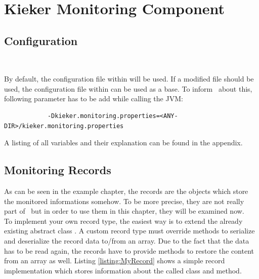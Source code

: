 % 


\chapter{Kieker Monitoring Component}\label{chap:componentsMonitoring}


	\section{Configuration}


\

\noindent By default, the configuration file within \dir{\mainJar} will be used. If a modified file should be used, the configuration file within  can be used as a base. To inform \Kieker\  about this, following parameter has to be add while calling the JVM:

		\setBashListing
		\begin{lstlisting} 
			-Dkieker.monitoring.properties=<ANY-DIR>/kieker.monitoring.properties      
		\end{lstlisting}

		\noindent A listing of all variables and their explanation can be found in the
		appendix.


	\section{Monitoring Records}\label{sec:componentsMonitoring:monitoringRecords}

		As can be seen in the example chapter, the records are the objects which store the monitored informations somehow. To be more precise, they are not really part of \KiekerMonitoringPart\, but in order to use them in this chapter, they will be examined now.\\ To implement your own record type, the easiest way is to extend the already existing abstract class . A custom record type must override methods to serialize and deserialize the record data to/from an array. Due to the fact that the data has to be read again, the records have to provide methods to restore the content from an array as well. Listing \ref{listing:MyRecord} shows a simple record implementation which stores information about the called class and method.

